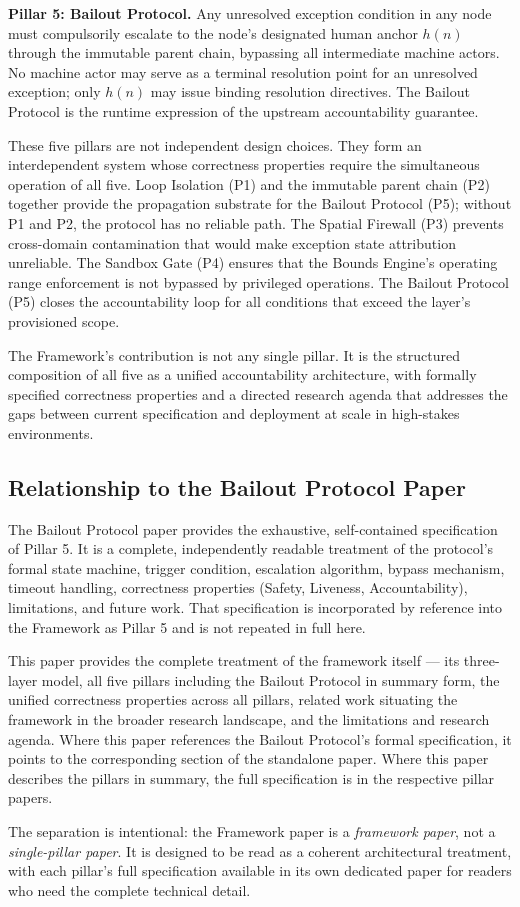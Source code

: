 \textbf{Pillar 5: Bailout Protocol.}  Any unresolved exception condition in any node must compulsorily escalate to the node's designated human anchor $h(n)$ through the immutable parent chain, bypassing all intermediate machine actors.  No machine actor may serve as a terminal resolution point for an unresolved exception; only $h(n)$ may issue binding resolution directives.  The Bailout Protocol is the runtime expression of the upstream accountability guarantee.

These five pillars are not independent design choices.  They form an interdependent system whose correctness properties require the simultaneous operation of all five.  Loop Isolation (P1) and the immutable parent chain (P2) together provide the propagation substrate for the Bailout Protocol (P5); without P1 and P2, the protocol has no reliable path.  The Spatial Firewall (P3) prevents cross-domain contamination that would make exception state attribution unreliable.  The Sandbox Gate (P4) ensures that the Bounds Engine's operating range enforcement is not bypassed by privileged operations.  The Bailout Protocol (P5) closes the accountability loop for all conditions that exceed the \bounds{} layer's provisioned scope.

The \bxthree{} Framework's contribution is not any single pillar.  It is the structured composition of all five as a unified accountability architecture, with formally specified correctness properties and a directed research agenda that addresses the gaps between current specification and deployment at scale in high-stakes environments.

\subsection{Relationship to the Bailout Protocol Paper}\label{sec:relationship}

The Bailout Protocol paper provides the exhaustive, self-contained specification of Pillar 5.  It is a complete, independently readable treatment of the protocol's formal state machine, trigger condition, escalation algorithm, bypass mechanism, timeout handling, correctness properties (Safety, Liveness, Accountability), limitations, and future work.  That specification is incorporated by reference into the \bxthree{} Framework as Pillar 5 and is not repeated in full here.

This paper provides the complete treatment of the framework itself --- its three-layer model, all five pillars including the Bailout Protocol in summary form, the unified correctness properties across all pillars, related work situating the framework in the broader research landscape, and the limitations and research agenda.  Where this paper references the Bailout Protocol's formal specification, it points to the corresponding section of the standalone paper.  Where this paper describes the pillars in summary, the full specification is in the respective pillar papers.

The separation is intentional: the \bxthree{} Framework paper is a \emph{framework paper}, not a \emph{single-pillar paper}.  It is designed to be read as a coherent architectural treatment, with each pillar's full specification available in its own dedicated paper for readers who need the complete technical detail.